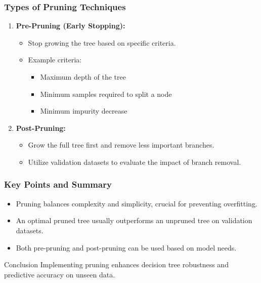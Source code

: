 \documentclass[aspectratio=169]{beamer}
\begin{document}
\begin{frame}[fragile]
    \frametitle{Types of Pruning Techniques}
    \begin{enumerate}
        \item \textbf{Pre-Pruning (Early Stopping):}
            \begin{itemize}
                \item Stop growing the tree based on specific criteria.
                \item Example criteria:
                    \begin{itemize}
                        \item Maximum depth of the tree
                        \item Minimum samples required to split a node
                        \item Minimum impurity decrease
                    \end{itemize}
            \end{itemize}
        \item \textbf{Post-Pruning:}
            \begin{itemize}
                \item Grow the full tree first and remove less important branches.
                \item Utilize validation datasets to evaluate the impact of branch removal.
            \end{itemize}
    \end{enumerate}
\end{frame}

\begin{frame}[fragile]
    \frametitle{Key Points and Summary}
    \begin{itemize}
        \item Pruning balances complexity and simplicity, crucial for preventing overfitting.
        \item An optimal pruned tree usually outperforms an unpruned tree on validation datasets.
        \item Both pre-pruning and post-pruning can be used based on model needs.
    \end{itemize}
    
    \begin{block}{Conclusion}
        Implementing pruning enhances decision tree robustness and predictive accuracy on unseen data.
    \end{block}
\end{frame}
\end{document}
